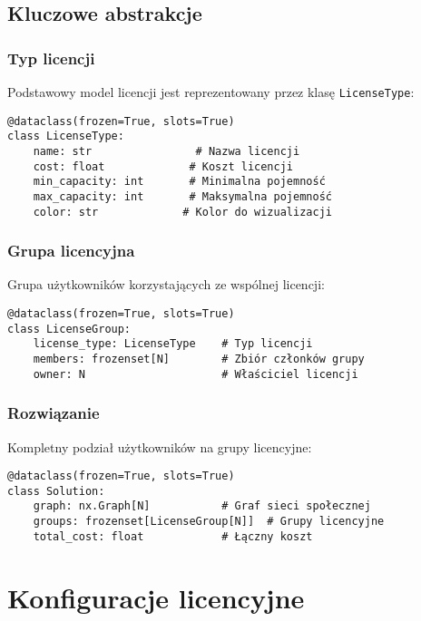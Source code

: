 \subsection{Kluczowe abstrakcje}

\subsubsection{Typ licencji}

Podstawowy model licencji jest reprezentowany przez klasę \texttt{LicenseType}:

\begin{verbatim}
@dataclass(frozen=True, slots=True)
class LicenseType:
    name: str                # Nazwa licencji
    cost: float             # Koszt licencji
    min_capacity: int       # Minimalna pojemność
    max_capacity: int       # Maksymalna pojemność
    color: str             # Kolor do wizualizacji
\end{verbatim}

\subsubsection{Grupa licencyjna}

Grupa użytkowników korzystających ze wspólnej licencji:

\begin{verbatim}
@dataclass(frozen=True, slots=True)
class LicenseGroup:
    license_type: LicenseType    # Typ licencji
    members: frozenset[N]        # Zbiór członków grupy
    owner: N                     # Właściciel licencji
\end{verbatim}

\subsubsection{Rozwiązanie}

Kompletny podział użytkowników na grupy licencyjne:

\begin{verbatim}
@dataclass(frozen=True, slots=True)
class Solution:
    graph: nx.Graph[N]           # Graf sieci społecznej
    groups: frozenset[LicenseGroup[N]]  # Grupy licencyjne
    total_cost: float            # Łączny koszt
\end{verbatim}

\section{Konfiguracje licencyjne}


